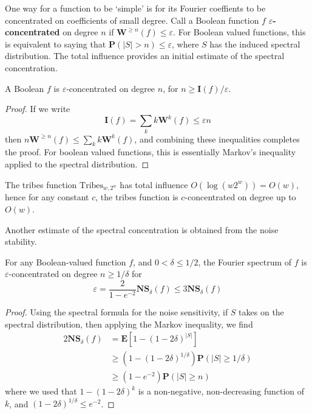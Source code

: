 One way for a function to be `simple' is for its Fourier coeffients to be concentrated on coefficients of small degree. Call a Boolean function $f$ {\bf $\varepsilon$-concentrated} on degree $n$ if $\mathbf{W}^{\geq n}(f) \leq \varepsilon$. For Boolean valued functions, this is equivalent to saying that $\mathbf{P}(|S| > n) \leq \varepsilon$, where $S$ has the induced spectral distribution. The total influence provides an initial estimate of the spectral concentration.

\begin{theorem}
    A Boolean $f$ is $\varepsilon$-concentrated on degree $n$, for $n \geq \mathbf{I}(f)/\varepsilon$.
\end{theorem}
\begin{proof}
    If we write
    \[ \mathbf{I}(f) = \sum_k k \mathbf{W}^k(f) \leq \varepsilon n \]
    then $n \mathbf{W}^{\geq n}(f) \leq \sum_k k \mathbf{W}^k(f)$, and combining these inequalities completes the proof. For boolean valued functions, this is essentially Markov's inequality applied to the spectral distribution.
\end{proof}

\begin{example}
    The tribes function $\text{Tribes}_{w,2^w}$ has total influence $O(\log(w2^w)) = O(w)$, hence for any constant $c$, the tribes function is $c$-concentrated on degree up to $O(w)$.
\end{example}

Another estimate of the spectral concentration is obtained from the noise stability.

\begin{theorem}
    For any Boolean-valued function $f$, and $0 < \delta \leq 1/2$, the Fourier spectrum of $f$ is $\varepsilon$-concentrated on degree $n \geq 1/\delta$ for
    \[ \varepsilon = \frac{2}{1 - e^{-2}} \mathbf{NS}_\delta(f) \leq 3 \mathbf{NS}_\delta(f) \]
\end{theorem}
\begin{proof}
    Using the spectral formula for the noise sensitivity, if $S$ takes on the spectral distribution, then applying the Markov inequality, we find
    \begin{align*}
        2 \mathbf{NS}_\delta(f) &= \mathbf{E}[1 - (1 - 2\delta)^{|S|}]\\
        &\geq (1 - (1 - 2\delta)^{1/\delta}) \mathbf{P}(|S| \geq 1/\delta)\\
        &\geq (1 - e^{-2}) \mathbf{P}(|S| \geq n)
    \end{align*}
    where we used that $1 - (1 - 2\delta)^k$ is a non-negative, non-decreasing function of $k$, and $(1 - 2\delta)^{1/\delta} \leq e^{-2}$.
\end{proof}

